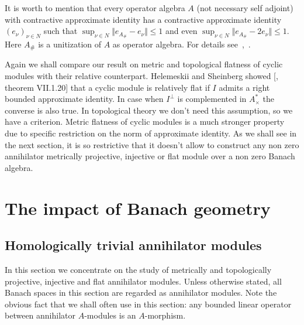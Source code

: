 It is worth to mention that every operator algebra $A$ (not necessary self
adjoint) with contractive approximate identity has a contractive approximate
identity ${(e_\nu)}_{\nu\in N}$ such 
that $\sup_{\nu\in N}\Vert e_{A_\#}-e_\nu\Vert\leq 1$ and 
even $\sup_{\nu\in N}\Vert e_{A_\#}-2e_\nu\Vert\leq 1$. Here $A_\#$ is 
a unitization of $A$ as operator algebra. For details
see~\cite{PosAndApproxIdinBanAlg},~\cite{BleContrAppIdInOpAlg}.

Again we shall compare our result on metric and topological flatness of cyclic
modules with their relative counterpart. Helemeskii and Sheinberg showed
[\cite{HelHomolBanTopAlg}, theorem VII.1.20] that a cyclic module is relatively
flat if $I$ admits a right bounded approximate identity. In case when $I^\perp$
is complemented in $A_\times^*$ the converse is also true. In topological theory
we don't need this assumption, so we have a criterion. Metric flatness of cyclic
modules is a much stronger property due to specific restriction on the norm of
approximate identity. As we shall see in the next section, it is so restrictive
that it doesn't allow to construct any non zero annihilator metrically
projective, injective or flat module over a non zero Banach algebra.


\section{
    The impact of Banach geometry
}\label{SectionTheImpactOfBanachGeometry}



\subsection{
    Homologically trivial annihilator modules
}\label{SubSectionHomoligicallyTrivialAnnihilatorModules}

In this section we concentrate on the study of metrically and topologically
projective, injective and flat annihilator modules. Unless otherwise stated, all
Banach spaces in this section are regarded as annihilator modules. Note the
obvious fact that we shall often use in this section: any bounded linear
operator between annihilator $A$-modules is an $A$-morphism.

